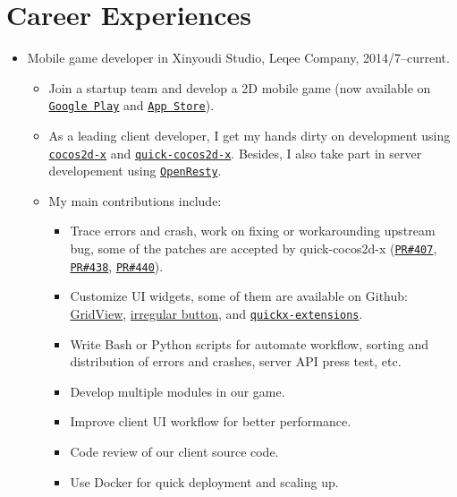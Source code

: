 \documentclass[letterpaper]{article}
\begin{document}
\section*{Career Experiences}
\begin{itemize}
    \item Mobile game developer in Xinyoudi Studio, Leqee Company, 2014/7--current.
        \begin{itemize}
            \item Join a startup team and develop a 2D mobile game (now available on 
                \href{https://play.google.com/store/apps/details?id=com.game168.yysg}{\tt Google Play} and
                \href{https://itunes.apple.com/us/app/ye-ye-san-guo/id976517523?mt=8}{\tt App Store}).
            \item As a leading client developer, I get my hands dirty on development using \href{http://cocos2d-x.org/}{\tt cocos2d-x} and \href{https://github.com/dualface/v3quick}{\tt quick-cocos2d-x}. Besides, I also take part in server developement using \href{https://github.com/openresty/openresty}{\tt OpenResty}.
            \item My main contributions include:
                \begin{itemize}
                    \item Trace errors and crash, work on fixing or workarounding upstream bug, some of the patches are accepted by quick-cocos2d-x (\href{https://github.com/dualface/v3quick/pull/407}{\tt PR\#407}, \href{https://github.com/dualface/v3quick/pull/438}{\tt PR\#438}, \href{https://github.com/dualface/v3quick/pull/440}{\tt PR\#440}).
                    \item Customize UI widgets, some of them are available on Github: \href{https://github.com/yszheda/cocos2d-x-GridView}{GridView}, \href{https://github.com/yszheda/cocos2d-x-irregular-button}{irregular button}, and \href{https://github.com/yszheda/quickx-extensions}{\tt quickx-extensions}.
                    \item Write Bash or Python scripts for automate workflow, sorting and distribution of errors and crashes, server API press test, etc.
                    \item Develop multiple modules in our game.
                    \item Improve client UI workflow for better performance.
                    \item Code review of our client source code.
                    \item Use Docker for quick deployment and scaling up.
                \end{itemize}
        \end{itemize}
\end{itemize}
\end{document}
